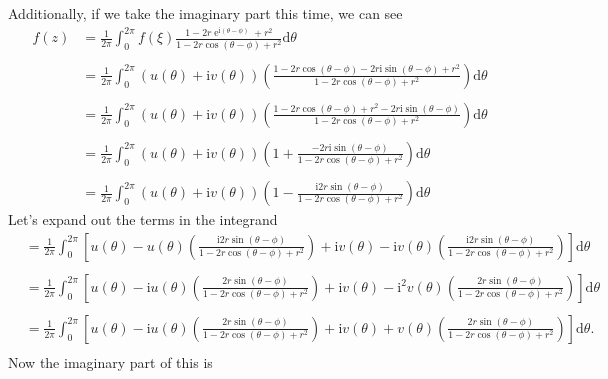 \documentclass[10pt]{amsart}
\newcommand{\D}{\mathrm{d}}
\newcommand{\I}{\mathrm{i}}
\DeclareMathOperator{\E}{e}
\theoremstyle{nonumberplain}
\begin{document}
\begin{enumerate}[label={\bf {\arabic*}:}]
\noindent
Additionally, if we take the imaginary part this time, we can see
\begin{align*}
f(z) &= \frac 1 {2\pi} \int_0^{2\pi} f(\xi) \frac{1 - 2r \E^{\I (\theta - \phi)} + r^2}{1 - 2r \cos (\theta - \phi) + r^2} \D \theta \nonumber \\ \\
	&= \frac 1 {2\pi} \int_0^{2\pi} (u(\theta) + \I v(\theta))\left(\frac{1 - 2r \cos(\theta - \phi) -2r\I \sin(\theta - \phi) + r^2}{1 - 2r \cos (\theta - \phi) + r^2} \right) \D \theta \nonumber \\ \\
	&= \frac 1 {2\pi} \int_0^{2\pi} (u(\theta) + \I v(\theta))\left(\frac{1 - 2r \cos(\theta - \phi)  + r^2 -2r\I \sin(\theta - \phi)}{1 - 2r \cos (\theta - \phi) + r^2} \right) \D \theta \nonumber \\ \\
	&= \frac 1 {2\pi} \int_0^{2\pi} (u(\theta) + \I v(\theta))\left(1 + \frac{-2r\I \sin(\theta - \phi)}{1 - 2r \cos (\theta - \phi) + r^2} \right) \D \theta \nonumber \\ \\
	&= \frac 1 {2\pi} \int_0^{2\pi} (u(\theta) + \I v(\theta))\left(1 - \frac{\I 2r\sin(\theta - \phi)}{1 - 2r \cos (\theta - \phi) + r^2} \right) \D \theta
\end{align*}
Let's expand out the terms in the integrand
\begin{align*}
	&= \frac 1 {2\pi} \int_0^{2\pi} \left[
		u(\theta)
		- u(\theta)\left(\frac{\I 2r\sin(\theta - \phi)}{1 - 2r \cos (\theta - \phi) + r^2} \right)
		+ \I v(\theta)
		- \I v(\theta)\left(\frac{\I 2r\sin(\theta - \phi)}{1 - 2r \cos (\theta - \phi) + r^2} \right)
	\right] \D \theta \\ \\
	&= \frac 1 {2\pi} \int_0^{2\pi} \left[
		u(\theta)
		- \I u(\theta)\left(\frac{2r\sin(\theta - \phi)}{1 - 2r \cos (\theta - \phi) + r^2} \right)
		+ \I v(\theta)
		- \I^2 v(\theta)\left(\frac{2r\sin(\theta - \phi)}{1 - 2r \cos (\theta - \phi) + r^2} \right)
	\right] \D \theta \\ \\
	&= \frac 1 {2\pi} \int_0^{2\pi} \left[
		u(\theta)
		- \I u(\theta)\left(\frac{2r\sin(\theta - \phi)}{1 - 2r \cos (\theta - \phi) + r^2} \right)
		+ \I v(\theta)
		+ v(\theta)\left(\frac{2r\sin(\theta - \phi)}{1 - 2r \cos (\theta - \phi) + r^2} \right)
	\right] \D \theta. \\
\end{align*}
Now the imaginary part of this is

\end{enumerate}
\end{document}
